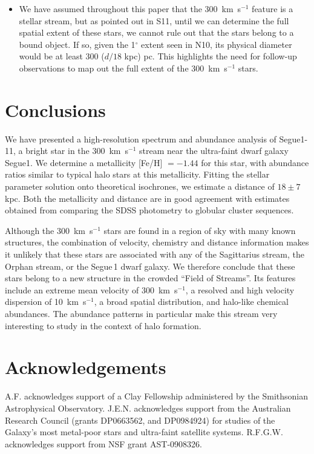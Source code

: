 \documentclass[manuscript]{aastex}
\begin{document}
\begin{itemize}
\item We have assumed throughout this paper that the 300~km~s$^{-1}$ feature is a stellar stream, but as pointed out in S11, until we can determine the full spatial extent of these stars, we cannot rule out that the stars belong to a bound object. If so, given the 1$^{\circ}$ extent seen in N10, its physical diameter would be at least 300 ($d / 18$ kpc) pc. This highlights the need for follow-up observations to map out the full extent of the 300~km~s$^{-1}$ stars.


\end{itemize}





\section{Conclusions}
\label{sec:conc}
We have presented a high-resolution spectrum and abundance analysis of Segue1-11, a bright star in the 300~km~s$^{-1}$ stream near the ultra-faint dwarf galaxy Segue1. We determine a metallicity [Fe/H] $= -1.44$ for this star, with abundance ratios similar to typical halo stars at this metallicity. Fitting the stellar parameter solution onto theoretical isochrones, we estimate a distance of $18 \pm 7$ kpc. Both the metallicity and distance are in good agreement with estimates obtained from comparing the SDSS photometry to globular cluster sequences.

Although the 300~km~s$^{-1}$ stars are found in a region of sky with many known structures, the combination of velocity, chemistry and distance information makes it unlikely that these stars are associated with any of the Sagittarius stream, the Orphan stream, or the Segue\,1 dwarf galaxy. We therefore conclude that these stars belong to a new structure in the crowded ``Field of Streams''. Its features include an extreme mean velocity of 300~km~s$^{-1}$, a resolved and high velocity dispersion of 10~km~s$^{-1}$, a broad spatial distribution, and halo-like chemical abundances. The abundance patterns in particular make this stream very interesting to study in the context of halo formation. 

 

\section{Acknowledgements}
A.F. acknowledges support of a Clay Fellowship administered by the Smithsonian Astrophysical Observatory. J.E.N. acknowledges support from the Australian Research Council (grants DP0663562, and DP0984924) for studies of the Galaxy's most metal-poor stars and ultra-faint satellite systems. R.F.G.W. acknowledges support from NSF grant AST-0908326.
\end{document}
